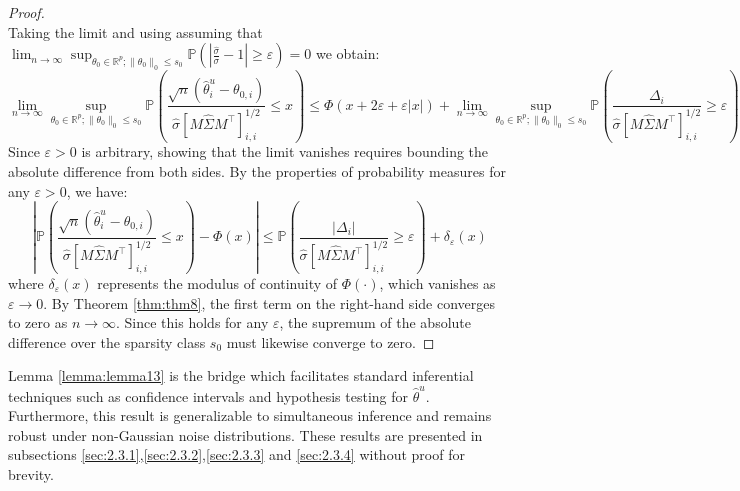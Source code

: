 \documentclass{article}
\begin{document}
\begin{proof}
$$    $$
    Taking the limit and using assuming that $\lim_{n \to \infty} \sup_{\theta_0 \in \mathbb{R}^p; \|\theta_0\|_0 \le s_0}\mathbb{P}\left(\left|\frac{\hat{\sigma}}{\sigma} - 1\right| \ge \varepsilon \right) = 0$ we obtain:
    $$
          \lim_{n \to \infty} \sup_{\theta_0 \in \mathbb{R}^p; \|\theta_0\|_0 \le s_0}\mathbb{P}\left(\frac{\sqrt{n}(\hat{\theta}^u_i - \theta_{0,i})}{\hat{\sigma} [M \hat{\Sigma}M^{\top}]_{i,i}^{1/2}}  \le x \right) \le \Phi(x + 2\varepsilon + \varepsilon |x| ) + \lim_{n \to \infty} \sup_{\theta_0 \in \mathbb{R}^p; \|\theta_0\|_0  \le s_0} \mathbb{P}\left( \frac{\Delta_i}{\hat{\sigma}[M \hat{\Sigma}M^\top]^{1/2}_{i,i}}  \ge \varepsilon\right)
    $$
Since $\varepsilon > 0$ is arbitrary, showing that the limit vanishes requires bounding the absolute difference from both sides. By the properties of probability measures for any $\varepsilon > 0$, we have:
\begin{equation}
    \left| \mathbb{P}\left( \frac{\sqrt{n}(\hat{\theta}^u_i - \theta_{0,i})}{\hat{\sigma} [M \hat{\Sigma}M^{\top}]_{i,i}^{1/2}} \le x \right) - \Phi(x) \right| \le \mathbb{P}\left( \frac{|\Delta_i|}{\hat{\sigma}[M \hat{\Sigma}M^\top]^{1/2}_{i,i}} \ge \varepsilon \right) + \delta_\varepsilon(x)
\end{equation}
where $\delta_\varepsilon(x)$ represents the modulus of continuity of $\Phi(\cdot)$, which vanishes as $\varepsilon \to 0$. By Theorem \ref{thm:thm8}, the first term on the right-hand side converges to zero as $n \to \infty$. Since this holds for any $\varepsilon$, the supremum of the absolute difference over the sparsity class $s_0$ must likewise converge to zero.
\end{proof}
Lemma \ref{lemma:lemma13} is the bridge which facilitates standard inferential techniques such as confidence intervals and hypothesis testing for $\hat{\theta}^u$. Furthermore, this result is generalizable to simultaneous inference and remains robust under non-Gaussian noise distributions. These results are presented in subsections \ref{sec:2.3.1},\ref{sec:2.3.2},\ref{sec:2.3.3} and \ref{sec:2.3.4} without proof for brevity.
\end{document}
